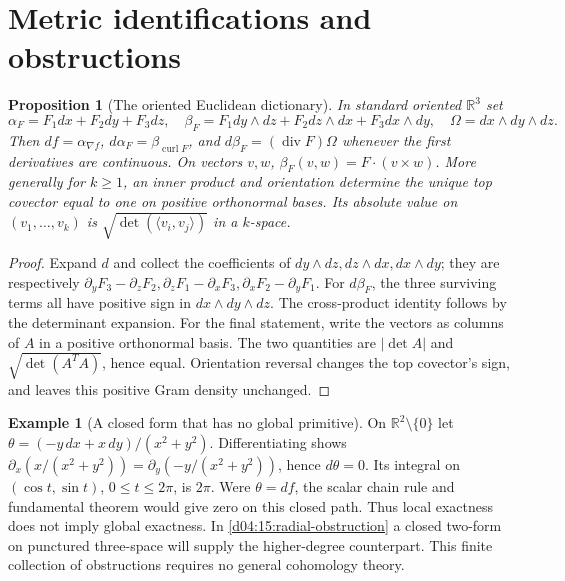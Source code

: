 \documentclass[11pt,oneside,openany]{book}
\newtheorem{proposition}[theorem]{Proposition}
\theoremstyle{definition}
\newtheorem{example}[theorem]{Example}
\theoremstyle{remark}
\newcommand{\R}{\mathbb R}
\newcommand{\ip}[2]{\langle#1,#2\rangle}
\newcommand{\family}[1]{}
\begin{document}
\section{Metric identifications and obstructions}
\family{K04.13.11}\family{K04.13.12}
\begin{proposition}[The oriented Euclidean dictionary]\label{d04:13:dictionary}
In standard oriented $\R^3$ set
\[
 \alpha_F=F_1dx+F_2dy+F_3dz,\quad
 \beta_F=F_1dy\wedge dz+F_2dz\wedge dx+F_3dx\wedge dy,
 \quad \Omega=dx\wedge dy\wedge dz.
\]
Then $df=\alpha_{\nabla f}$, $d\alpha_F=\beta_{\operatorname{curl}F}$,
and $d\beta_F=(\operatorname{div}F)\Omega$ whenever the first derivatives
are continuous. On vectors $v,w$, $\beta_F(v,w)=F\cdot(v\times w)$.
More generally for $k\ge1$, an inner product and orientation determine the unique top
covector equal to one on positive orthonormal bases. Its absolute value on
$(v_1,\ldots,v_k)$ is $\sqrt{\det(\ip{v_i}{v_j})}$ in a $k$-space.
\end{proposition}
\begin{proof}
Expand $d$ and collect the coefficients of $dy\wedge dz,dz\wedge dx,
dx\wedge dy$; they are respectively
$\partial_yF_3-\partial_zF_2,\partial_zF_1-\partial_xF_3,
\partial_xF_2-\partial_yF_1$. For $d\beta_F$, the three surviving terms
all have positive sign in $dx\wedge dy\wedge dz$. The cross-product
identity follows by the determinant expansion. For the final statement,
write the vectors as columns of $A$ in a positive orthonormal basis. The
two quantities are $|\det A|$ and $\sqrt{\det(A^TA)}$, hence equal.
Orientation reversal changes the top covector's sign, and leaves this
positive Gram density unchanged.
\end{proof}

\begin{example}[A closed form that has no global primitive]\label{d04:13:angular}
On $\R^2\setminus\{0\}$ let
$\theta=(-y\,dx+x\,dy)/(x^2+y^2)$. Differentiating shows
$\partial_x(x/(x^2+y^2))=\partial_y(-y/(x^2+y^2))$, hence $d\theta=0$.
Its integral on $(\cos t,\sin t)$, $0\le t\le2\pi$, is $2\pi$.
Were $\theta=df$, the scalar chain rule and fundamental theorem would give
zero on this closed path. Thus local exactness does not imply global exactness.
In \cref{d04:15:radial-obstruction} a closed two-form on punctured three-space
will supply the higher-degree counterpart. This finite collection of
obstructions requires no general cohomology theory.
\end{example}

\end{document}
